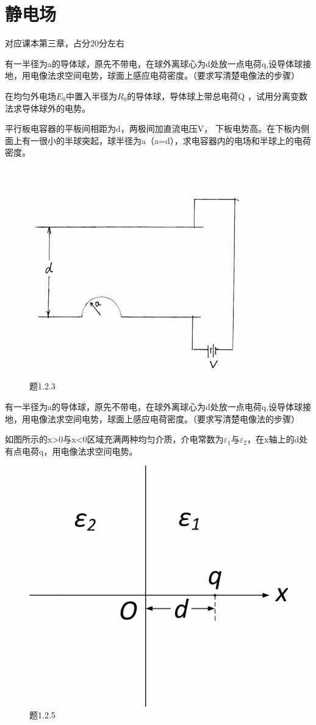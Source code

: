 \section{静电场}
对应课本第三章，占分20分左右

\begin{question}
有一半径为a的导体球，原先不带电，在球外离球心为d处放一点电荷q,设导体球接地，用电像法求空间电势，球面上感应电荷密度。（要求写清楚电像法的步骤）
\end{question}

\begin{question}
在均匀外电场$E_0$中置入半径为$R_0$的导体球，导体球上带总电荷Q ，试用分离变数法求导体球外的电势。
\end{question}

\begin{question}
平行板电容器的平板间相距为d，两极间加直流电压V，
下板电势高。在下板内侧面上有一很小的半球突起，球半径为a（a=d），求电容器内的电场和半球上的电荷密度。
\begin{figure}[ht]
\centering
\includegraphics[height=3 cm]{images/q1_2_3.jpg}
\caption{题1.2.3}
\end{figure}

\end{question}

\begin{question}
有一半径为a的导体球，原先不带电，在球外离球心为d处放一点电荷q,设导体球接地，用电像法求空间电势，球面上感应电荷密度。（要求写清楚电像法的步骤）
\end{question}

\begin{question}
如图所示的x>0与x<0区域充满两种均匀介质，介电常数为$\varepsilon_1$与$\varepsilon_2$，在x轴上的d处有点电荷q，用电像法求空间电势。
\begin{figure}[ht]
\centering
\includegraphics[height=3 cm]{images/q1_2_5.png}
\caption{题1.2.5}
\end{figure}
\end{question}

